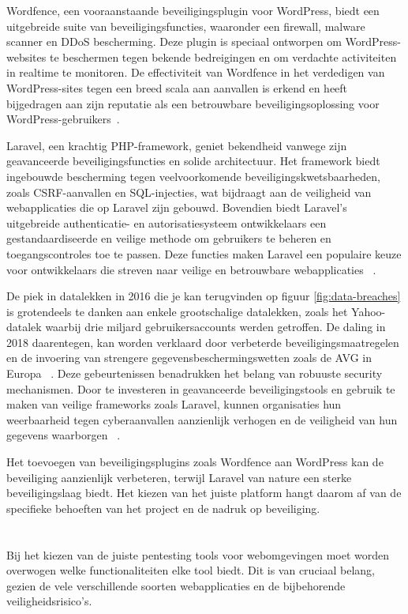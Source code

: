 Wordfence, een vooraanstaande beveiligingsplugin voor WordPress, biedt een uitgebreide suite van beveiligingsfuncties, waaronder een 
firewall, malware scanner en DDoS bescherming. Deze plugin is speciaal ontworpen om WordPress-websites te beschermen tegen bekende 
bedreigingen en om verdachte activiteiten in realtime te monitoren. De effectiviteit van Wordfence in het verdedigen van WordPress-sites 
tegen een breed scala aan aanvallen is erkend en heeft bijgedragen aan zijn reputatie als een betrouwbare beveiligingsoplossing voor 
WordPress-gebruikers~\autocite{277144}.

Laravel, een krachtig PHP-framework, geniet bekendheid vanwege zijn geavanceerde beveiligingsfuncties en solide architectuur. Het 
framework biedt ingebouwde bescherming tegen veelvoorkomende beveiligingskwetsbaarheden, zoals CSRF-aanvallen en SQL-injecties, wat 
bijdraagt aan de veiligheid van webapplicaties die op Laravel zijn gebouwd. Bovendien biedt Laravel's uitgebreide authenticatie- en 
autorisatiesysteem ontwikkelaars een gestandaardiseerde en veilige methode om gebruikers te beheren en toegangscontroles toe te passen. 
Deze functies maken Laravel een populaire keuze voor ontwikkelaars die streven naar veilige en betrouwbare webapplicaties
~\autocite{Adamu2020}.

De piek in datalekken in 2016 die je kan terugvinden op figuur \ref{fig:data-breaches} is grotendeels te danken aan enkele grootschalige datalekken, zoals het Yahoo-datalek waarbij 
drie miljard gebruikersaccounts werden getroffen. De daling in 2018 daarentegen, kan worden verklaard door verbeterde beveiligingsmaatregelen 
en de invoering van strengere gegevensbeschermingswetten zoals de AVG in Europa ~\autocite{Petrosyan2024}. Deze gebeurtenissen benadrukken het belang van 
robuuste security mechanismen. Door te investeren in geavanceerde beveiligingstools en gebruik te maken van veilige 
frameworks zoals Laravel, kunnen organisaties hun weerbaarheid tegen cyberaanvallen aanzienlijk verhogen en de veiligheid van hun 
gegevens waarborgen ~\autocite{Petrosyan2024}.

Het toevoegen van beveiligingsplugins zoals Wordfence aan WordPress kan de beveiliging aanzienlijk verbeteren, terwijl Laravel van nature een 
sterke beveiligingslaag biedt. Het kiezen van het juiste platform hangt daarom af van de specifieke behoeften van het project en de nadruk op beveiliging.
\section{}
\label{sec:Pentesting tools}
Bij het kiezen van de juiste pentesting tools voor webomgevingen moet worden overwogen welke functionaliteiten 
elke tool biedt. Dit is van cruciaal belang, gezien de vele verschillende soorten webapplicaties en de bijbehorende veiligheidsrisico's.

